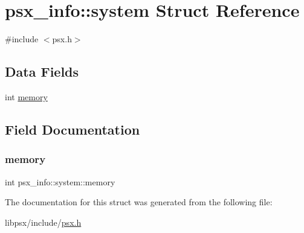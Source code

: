 \hypertarget{structpsx__info_1_1system}{}\section{psx\+\_\+info\+:\+:system Struct Reference}
\label{structpsx__info_1_1system}


{\ttfamily \#include $<$psx.\+h$>$}

\subsection*{Data Fields}
\begin{DoxyCompactItemize}
\item 
int \hyperlink{structpsx__info_1_1system_a95e9c8433456eed32ee8b64308ce7778}{memory}
\end{DoxyCompactItemize}


\subsection{Field Documentation}
\mbox{\label{structpsx__info_1_1system_a95e9c8433456eed32ee8b64308ce7778}} 
\subsubsection{\texorpdfstring{memory}{memory}}
{\footnotesize\ttfamily int psx\+\_\+info\+::system\+::memory}



The documentation for this struct was generated from the following file\+:\begin{DoxyCompactItemize}
\item 
libpsx/include/\hyperlink{psx_8h}{psx.\+h}\end{DoxyCompactItemize}
